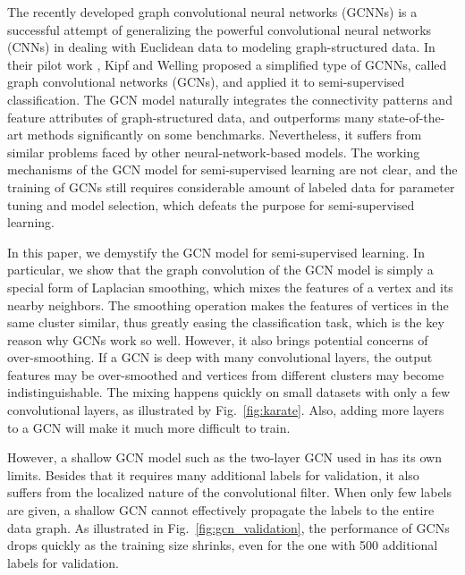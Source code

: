 \documentclass[letterpaper]{article} \usepackage{aaai18}  \usepackage{times}  \usepackage{helvet}  \usepackage{courier}  \usepackage{url}  \usepackage{graphicx}  \usepackage{algorithm}
\begin{document}
The recently developed graph convolutional neural networks (GCNNs) \cite{defferrard2016convolutional} is a successful attempt of generalizing the powerful convolutional neural networks (CNNs) in dealing with Euclidean data to modeling graph-structured data. In their pilot work \cite{kipf2016semi}, Kipf and Welling proposed a simplified type of GCNNs, called graph convolutional networks (GCNs), and applied it to semi-supervised classification. The GCN model naturally integrates the connectivity patterns and feature attributes of graph-structured data, and outperforms many state-of-the-art methods significantly on some benchmarks. Nevertheless, it suffers from similar problems faced by other neural-network-based models. The working mechanisms of the GCN model for semi-supervised learning are not clear, and the training of GCNs still requires considerable amount of labeled data for parameter tuning and model selection, which defeats the purpose for semi-supervised learning.
































In this paper, we demystify the GCN model for semi-supervised learning. In particular, we show that the graph convolution of the GCN model is simply a special form of Laplacian smoothing, which mixes the features of a vertex and its nearby neighbors. The smoothing operation makes the features of vertices in the same cluster similar, thus greatly easing the classification task, which is the key reason why GCNs work so well. However, it also brings potential concerns of over-smoothing. If a GCN is deep with many convolutional layers, the output features may be over-smoothed and vertices from different clusters may become indistinguishable. The mixing happens quickly on small datasets with only a few convolutional layers, as illustrated by Fig.~\ref{fig:karate}. Also, adding more layers to a GCN will make it much more difficult to train.

However, a shallow GCN model such as the two-layer GCN used in \cite{kipf2016semi} has its own limits. Besides that it requires many additional labels for validation, it also suffers from the localized nature of the convolutional filter. When only few labels are given, a shallow GCN cannot effectively propagate the labels to the entire data graph. As illustrated in Fig.~\ref{fig:gcn_validation}, the performance of GCNs drops quickly as the training size shrinks, even for the one with 500 additional labels for validation.
\end{document}
